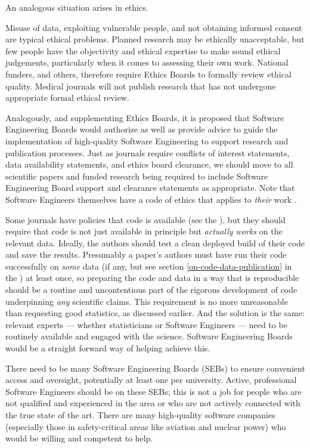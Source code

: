 \documentclass{comjnl}
\begin{document}
An analogous situation arises in ethics. 

Misuse of data, exploiting vulnerable people, and not obtaining informed consent are typical ethical problems. Planned research may be ethically unacceptable, but few people have the objectivity and ethical expertise to make sound ethical judgements, particularly when it comes to assessing their own work. National funders, and others, therefore require Ethics Boards to formally review ethical quality. Medical journals will not publish research that has not undergone appropriate formal ethical review. 

Analogously, and supplementing Ethics Boards, it is proposed that Software Engineering Boards would authorize as well as provide advice to guide the implementation of high-quality Software Engineering to support research and publication processes. Just as journals require conflicts of interest statements, data availability statements, and ethics board clearance, we should move to  all scientific papers and funded research being required to include Software Engineering Board support and clearance statements as appropriate. Note that Software Engineers themselves have a code of ethics that applies to \emph{their\/} work \cite{ethics-code}.

Some journals have policies that code is available (see the \supplement), but they should require that code is not just available in principle but \emph{actually works\/} on the relevant data. Ideally, the authors should test a clean deployed build of their code and save the results. Presumably a paper's authors must have run their code successfully on \emph{some\/} data (if any, but see section \ref{on-code-data-publication} in the \supplement) at least once, so preparing the code and data in a way that is reproducible should be a routine and uncontentious part of the rigorous development of  code underpinning \emph{any\/} scientific claims. This requirement is no more unreasonable than requesting good statistics, as discussed earlier. And the solution is the same: relevant experts --- whether statisticians or Software Engineers --- need to be routinely available and engaged with the science. Software Engineering Boards would be a straight forward way of helping achieve this.

There need to be many Software Engineering Boards (SEBs) to ensure convenient access and oversight, potentially at least one per university. Active, professional Software Engineers should be on these SEBs; this is not a job for people who are not qualified and experienced in the area or who are not actively connected with the true state of the art. There are many high-quality software companies (especially those in safety-critical areas like aviation and nuclear power) who would be willing and competent to help.
\end{document}
